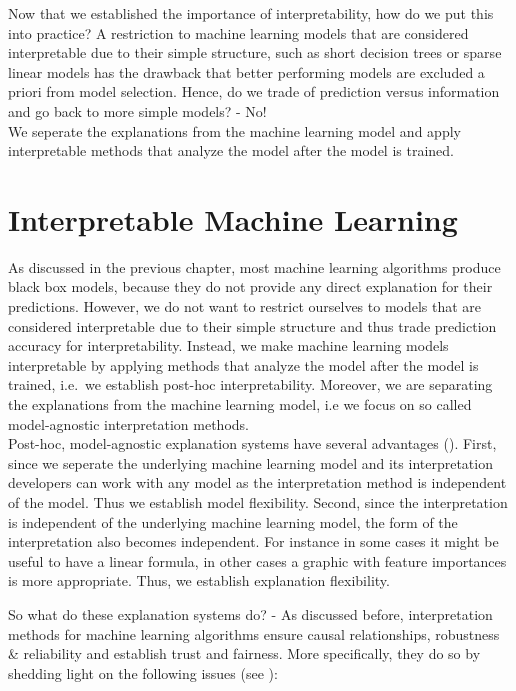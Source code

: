\documentclass[
]{krantz}
\begin{document}
Now that we established the importance of interpretability, how do we put this into practice? A restriction to machine learning models that are considered interpretable due to their simple structure, such as short decision trees or sparse linear models has the drawback that better performing models are excluded a priori from model selection. Hence, do we trade of prediction versus information and go back to more simple models? - No!\\
We seperate the explanations from the machine learning model and apply interpretable methods that analyze the model after the model is trained.

\hypertarget{interpretable-machine-learning}{%
\section{Interpretable Machine Learning}\label{interpretable-machine-learning}}

As discussed in the previous chapter, most machine learning algorithms produce black box models, because they do not provide any direct explanation for their predictions. However, we do not want to restrict ourselves to models that are considered interpretable due to their simple structure and thus trade prediction accuracy for interpretability.
Instead, we make machine learning models interpretable by applying methods that analyze the model after the model is trained, i.e.~we establish post-hoc interpretability. Moreover, we are separating the explanations from the machine learning model, i.e we focus on so called model-agnostic interpretation methods.\\
Post-hoc, model-agnostic explanation systems have several advantages (\citet{ribeiro2016model}). First, since we seperate the underlying machine learning model and its interpretation developers can work with any model as the interpretation method is independent of the model. Thus we establish model flexibility. Second, since the interpretation is independent of the underlying machine learning model, the form of the interpretation also becomes independent. For instance in some cases it might be useful to have a linear formula, in other cases a graphic with feature importances is more appropriate. Thus, we establish explanation flexibility.

So what do these explanation systems do? - As discussed before, interpretation methods for machine learning algorithms ensure causal relationships, robustness \& reliability and establish trust and fairness. More specifically, they do so by shedding light on the following issues (see \citet{molnar2019}):
\end{document}
